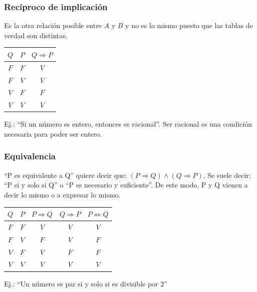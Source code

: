 \documentclass[10pt,a4paper,openright]{book}
\begin{document}
\subsubsection*{Recíproco de implicación}
Es la otra relación posible entre $A$ y $B$ y no es lo mismo puesto que las tablas de verdad son distintas.
\begin{center}
 \begin{tabular}{ |c|c|c| } 
   \hline
     $Q$ & $P$ & $Q \Rightarrow P$ \\ [0.5ex] 
   \hline \hline
     $F$ & $F$ & $V$ \\
   \hline 
     $F$ & $V$ & $V$ \\
   \hline
     $V$ & $F$ & $F$ \\
   \hline
     $V$ & $V$ & $V$ \\
   \hline
 \end{tabular}
\end{center}

\vspace{0.5cm}
Ej.: “Si un número es entero, entonces es racional”. Ser racional es una condición necesaria para poder ser entero.

\subsubsection*{Equivalencia}
“P es equivalente a Q” quiere decir que: $(P \Rightarrow Q) \wedge (Q \Rightarrow P)$. Se suele decir: “P si y solo si Q” o “P es necesario y suficiente”. De este modo, P y Q vienen a decir lo mismo o a expresar lo mismo.

\begin{center}
 \begin{tabular}{ |c|c|c|c|c| } 
   \hline
     $Q$ & $P$ & $P \Rightarrow Q$ & $Q \Rightarrow P$ & $P \Leftrightarrow Q$\\ [0.5ex] 
   \hline \hline
     $F$ & $F$ & $V$ & $V$ & $V$\\
   \hline 
     $F$ & $V$ & $F$ & $V$ & $F$\\
   \hline
     $V$ & $F$ & $V$ & $F$ & $F$\\
   \hline
     $V$ & $V$ & $V$ & $V$ & $V$\\
   \hline
 \end{tabular}
\end{center}

Ej.: “Un número es par si y solo si es divisible por 2”
\end{document}

